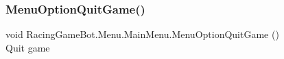 \subsubsection{\texorpdfstring{MenuOptionQuitGame()}{MenuOptionQuitGame()}}
{\footnotesize\ttfamily void RacingGameBot.Menu.MainMenu.MenuOptionQuitGame ()}\\
Quit game 
